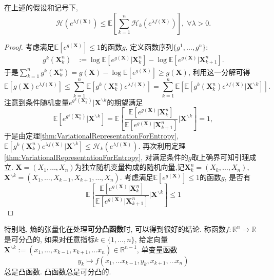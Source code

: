 \begin{lemma}[熵的张量化]\label{lemma:EntropyTensorization}
	在上述的假设和记号下, 
	\begin{equation*}
		\mathcal{H}(e^{\lambda f(\bm{X})})
		\leq \mathbb{E}\left[ \sum_{k=1}^n \mathcal{H}_k (e^{\lambda f(\bm{X})}) \right],\; 
		\forall \lambda > 0. 
	\end{equation*}
\end{lemma}
\begin{proof}
	考虑满足$\mathbb{E}[e^{g(\bm{X})}] \leq 1$的函数$g$, 定义函数序列$\{g^1, \dots, g^n\}$: 
	\begin{align*}
		g^k(\bm{X}_k^n) &:= \log \mathbb{E}[e^{g(\bm{X})} | \bm{X}_k^n] - \log \mathbb{E}[e^{g(\bm{X})} | \bm{X}_{k+1}^n]. 
	\end{align*}
	于是$\sum_{k=1}^n g^k(\bm{X}_k^n) = g(\bm{X}) - \log \mathbb{E}[ e^{g(\bm{X})} ] \geq g(\bm{X})$, 利用这一分解可得
	\begin{equation*}
		\mathbb{E}[ g(\bm{X}) e^{\lambda f(\bm{X})}]
		\leq \sum_{k=1}^n \mathbb{E}[ g^k(\bm{X}_k^n) e^{\lambda f(\bm{X})} ] 
		= \sum_{k=1}^n \mathbb{E}\left[ \mathbb{E}[ g^k(\bm{X}_k^n) e^{\lambda f(\bm{X})} | \bm{X}^{\backslash k} ] \right]. 
	\end{equation*}
	注意到条件随机变量$e^{g^k(\bm{X}_k^n)}| \bm{X}^{\backslash k}$的期望满足
	\begin{equation*}
		\mathbb{E}[e^{g^k(\bm{X}_k^n)}| \bm{X}^{\backslash k}]
		= \mathbb{E} \left[ \frac{\mathbb{E}[e^{g(\bm{X})} | \bm{X}_k^n]}{\mathbb{E}[e^{g(\bm{X})} | \bm{X}_{k+1}^n]} \bigg| \bm{X}^{\backslash k} \right]
		=1,  
	\end{equation*}
	于是由定理\ref{thm:VariationalRepresentationForEntropy}, $\mathbb{E}[ g^k(\bm{X}_k^n) e^{\lambda f(\bm{X})} | \bm{X}^{\backslash k} ] \leq \mathcal{H}_k(e^{\lambda f(\bm{X})})$. 
	再次利用定理\ref{thm:VariationalRepresentationForEntropy}, 对满足条件的$g$取上确界可知引理成立. 
	\sp 
	$\bm{X} = (X_1, \dots, X_n)$为独立随机变量构成的随机向量,记$\bm{X}_k^n = (X_k, \dots, X_n)$, $\bm{X}^{\backslash k} = (X_1, \dots, X_{k-1}, X_{k+1}, \dots, X_n)$. 
	考虑满足$\mathbb{E}[e^{g(\bm{X})}] \leq 1$的函数$g$, 是否有
	\begin{equation*}
		\mathbb{E} \left[ \frac{\mathbb{E}[e^{g(\bm{X})} | \bm{X}_k^n]}{\mathbb{E}[e^{g(\bm{X})} | \bm{X}_{k+1}^n]} \bigg| \bm{X}^{\backslash k} \right] \leq 1
	\end{equation*}
	\sp 
\end{proof}

特别地, 熵的张量化在处理\textbf{可分凸函数}时, 可以得到很好的结论. 
称函数$f \colon \mathbb{R}^n \to \mathbb{R}$是可分凸的, 如果对任意指标$k \in \{1, \dots, n\}$, 给定向量$\bm{X}^{\backslash k} := (x_1, \dots, x_{k-1}, x_{k+1}, \dots x_n) \in \mathbb{R}^{n-1}$, 单变量函数
\begin{equation*}
	y_k \mapsto f(x_1, \dots x_{k-1}, y_k, x_{k+1}, \dots x_n)
\end{equation*}
总是凸函数. 
凸函数总是可分凸的. 

